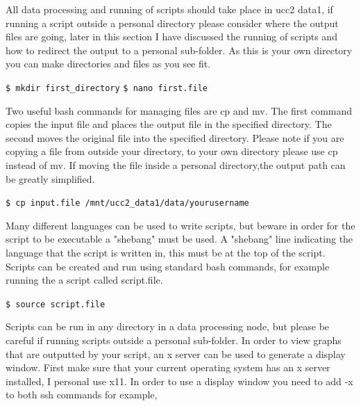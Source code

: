 \documentclass[11pt,fleqn]{book} %
\begin{document}
All data processing and running of scripts should take place in ucc2 data1, if running a script outside a personal directory please consider where the output files are going, later in this section I have discussed the running of scripts and how to redirect the output to a personal sub-folder. As this is your own directory you can make directories and files as you see fit.

\vspace{3mm}

\verb|$ mkdir first_directory|
\bigbreak{}
\verb|$ nano first.file|

\vspace{3mm}

Two useful bash commands for managing files are cp and mv. The first command copies the input file and places the output file in the specified directory. The second moves the original file into the specified directory. Please note if you are copying a file from outside your directory, to your own directory please use cp instead of mv. If moving the file inside a personal directory,the output path can be greatly simplified.
\vspace{3mm}

\verb|$ cp input.file /mnt/ucc2_data1/data/yourusername|

\vspace{3mm}
Many different languages can be used to write scripts, but beware in order for the script to be executable a "shebang" must be used. A "shebang" line indicating the language that the script is written in, this must be at the top of the script. Scripts can be created and run using standard bash commands, for example running the a script called script.file.

\vspace{3mm}

\verb|$ source script.file|

\vspace{3mm}

Scripts can be run in any directory in a data processing node, but please be careful if running scripts outside a personal sub-folder. In order to view graphs that are outputted by your script, an x server can be used to generate a display window. First make sure that your current operating system has an x server installed, I personal use x11. In order to use a display window you need to add -x to both ssh commands for example,

\vspace{3mm}
\end{document}
